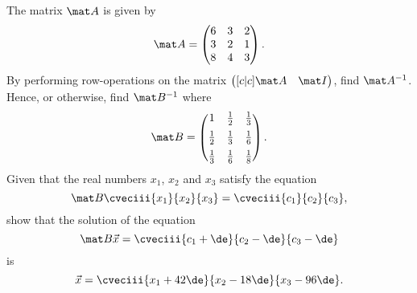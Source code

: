 \begin{problem}
    The matrix $\mat A$ is given by \[\mat A = \begin{pmatrix}6 & 3 & 2 \\ 3 & 2 & 1 \\ 8 & 4 & 3\end{pmatrix}.\] By performing row-operations on the matrix $\begin{pmatrix}[c|c] \mat A & \mat I\end{pmatrix}$, find $\mat A^{-1}$. Hence, or otherwise, find $\mat B^{-1}$ where \[\mat B = \begin{pmatrix}1 & \frac12 & \frac13 \\[0.5em] \frac12 & \frac13 & \frac16 \\[0.5em] \frac13 & \frac16 & \frac18\end{pmatrix}.\] Given that the real numbers $x_1$, $x_2$ and $x_3$ satisfy the equation \[\mat B \cveciii{x_1}{x_2}{x_3} = \cveciii{c_1}{c_2}{c_3},\] show that the solution of the equation \[\mat B \vec x = \cveciii{c_1 + \de}{c_2 - \de}{c_3 - \de}\] is \[\vec x = \cveciii{x_1 + 42\de}{x_2 - 18\de}{x_3 - 96\de}.\]
\end{problem}
